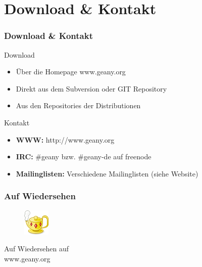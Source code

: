 \documentclass[compress]{beamer}
\begin{document}
\section{Download \& Kontakt}
\begin{frame}
	\frametitle{Download \& Kontakt}
	\begin{block}{Download}
		\begin{itemize}
			\item Über die Homepage www.geany.org
			\item Direkt aus dem Subversion oder GIT Repository
			\item Aus den Repositories der Distributionen
		\end{itemize}
	\end{block}
	\begin{block}{Kontakt}
		\begin{itemize}
			\item \textbf{WWW:} http://www.geany.org
			\item \textbf{IRC:} \#geany bzw. \#geany-de auf freenode
			\item \textbf{Mailinglisten:} Verschiedene Mailinglisten (siehe Website)
		\end{itemize}
	\end{block}
\end{frame}


\begin{frame}[plain]
	\frametitle{Auf Wiedersehen}
	\begin{figure}[ht]
		\includegraphics{img/geany.png}
	\end{figure}

	\begin{center}
	\huge Auf Wiedersehen auf \\ www.geany.org
	\end{center}
\end{frame}
\end{document}
